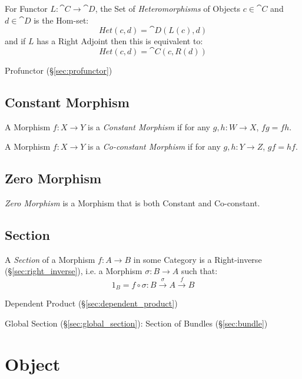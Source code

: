 For Functor $L : \cat{C} \rightarrow \cat{D}$, the Set of
\emph{Heteromorphisms} of Objects $c \in \cat{C}$ and $d \in
\cat{D}$ is the Hom-set:
\[
  Het(c,d) = \cat{D}(L(c), d)
\]
and if $L$ has a Right Adjoint then this is equivalent to:
\[
  Het(c,d) = \cat{C}(c, R(d))
\]

Profunctor (\S\ref{sec:profunctor})



\subsection{Constant Morphism}\label{sec:constant_morphism}

A Morphism $f : X \rightarrow Y$ is a \emph{Constant Morphism} if for
any $g, h : W \rightarrow X$, $fg = fh$.

A Morphism $f : X \rightarrow Y$ is a \emph{Co-constant Morphism} if
for any $g, h : Y \rightarrow Z$, $gf = hf$.



\subsection{Zero Morphism}\label{sec:zero_morphism}

\emph{Zero Morphism} is a Morphism that is both Constant and
Co-constant.



\subsection{Section}\label{sec:section}

A \emph{Section} of a Morphism $f : A \rightarrow B$ in some Category
is a Right-inverse (\S\ref{sec:right_inverse}), i.e. a Morphism
$\sigma : B \rightarrow A$ such that:
\[
  1_B = f \circ \sigma : B \xrightarrow{\sigma} A \xrightarrow{f} B
\]

Dependent Product (\S\ref{sec:dependent_product})

Global Section (\S\ref{sec:global_section}): Section of Bundles
(\S\ref{sec:bundle})



\section{Object}\label{sec:category_object}

